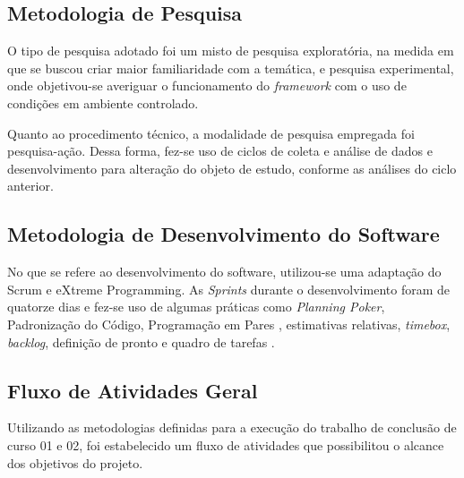   \subsection{Metodologia de Pesquisa} \label{Metodologia de Pesquisa}
	O tipo de pesquisa adotado foi um misto de pesquisa exploratória, na medida em que se buscou criar maior familiaridade com a temática, e pesquisa experimental, onde objetivou-se averiguar o funcionamento do \textit{framework} com o uso de condições em ambiente controlado. 
  \par
  \indent Quanto ao procedimento técnico, a modalidade de pesquisa empregada foi pesquisa-ação. Dessa forma, fez-se uso de ciclos de coleta e análise de dados e desenvolvimento para alteração do objeto de estudo, conforme as análises do ciclo anterior.

 \subsection{Metodologia de Desenvolvimento do Software} \label{Metodologia de Desenvolvimento do Software}
  No que se refere ao desenvolvimento do software, utilizou-se uma adaptação do Scrum e eXtreme Programming. As \textit{Sprints} durante o desenvolvimento foram de quatorze dias e fez-se uso de algumas práticas como \textit{Planning Poker}, Padronização do Código, Programação em Pares \cite{wells2009}, estimativas relativas, \textit{timebox}, \textit{backlog}, definição de pronto e quadro de tarefas \cite{scrum2014}. 
 
 \subsection{Fluxo de Atividades Geral}
 	
 	Utilizando as metodologias definidas para a execução do trabalho de conclusão de curso 01 e 02, foi estabelecido um fluxo de atividades que possibilitou o alcance dos objetivos do projeto.
 	

